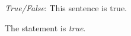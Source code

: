 \documentclass[11pt,letterpaper]{article}
\begin{document}
\thispagestyle{title}

\quizsol \textit{True/False}: This sentence is true. \pspace

\sol The statement is \textit{true}. 
\end{document}
